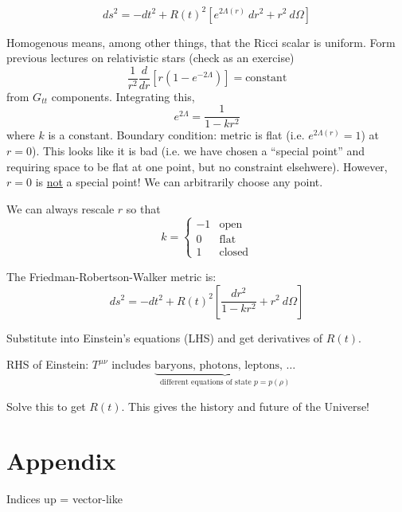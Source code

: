 \documentclass[a4paper]{article} %
\begin{document}
\begin{equation}
ds^2 = -dt^2 + R(t)^2 \left[e^{2\Lambda(r)}~dr^2 + r^2~d\Omega\right]
\end{equation}

Homogenous means, among other things, that the Ricci scalar is uniform. Form previous lectures on relativistic stars (check as an exercise)
\begin{equation}
\frac{1}{r^2}\frac{d}{dr}\left[r(1-e^{-2\Lambda})\right]=\text{constant}
\end{equation}
from $G_{tt}$ components. Integrating this,
\begin{equation}
e^{2\Lambda}=\frac{1}{1-kr^2}
\end{equation}
where $k$ is a constant. Boundary condition: metric is flat (i.e. $e^{2\Lambda(r)}=1$) at $r=0$). This looks like it is bad (i.e. we have chosen a ``special point'' and requiring space to be flat at one point, but no constraint elsehwere). However, $r=0$ is \underline{not} a special point! We can arbitrarily choose any point.

We can always rescale $r$ so that
\begin{equation}
k = \begin{cases}
-1 & \text{open}\\
0 & \text{flat} \\
1 & \text{closed}
\end{cases}
\end{equation}

The Friedman-Robertson-Walker metric is:
\begin{equation}
ds^2 = -dt^2 + R(t)^2 \left[\frac{dr^2}{1-kr^2}+r^2~d\Omega\right]
\end{equation}

Substitute into Einstein's equations (LHS) and get derivatives of $R(t)$. 

RHS of Einstein: $T^{\mu\nu}$ includes $\underbrace{\text{baryons, photons, leptons, $\ldots$}}_{\text{different equations of state $p=p(\rho)$}}$

Solve this to get $R(t)$. This gives the history and future of the Universe!



\pagebreak
\part{Appendix}

\setcounter{section}{0}
Indices up = vector-like
\end{document}
